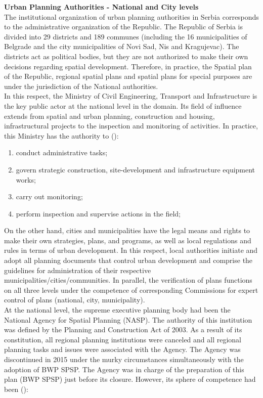 \documentclass[11pt]{report}
\begin{document}
{{{{\textbf{Urban Planning Authorities - National and City levels}
\\
The institutional organization of urban planning authorities in Serbia corresponds to the administrative organization of the Republic. The Republic of Serbia is divided into 29 districts and 189 communes (including the 16 municipalities of Belgrade and the city municipalities of Novi Sad, Nis and Kragujevac). The districts act as political bodies, but they are not authorized to make their own decisions regarding spatial development. Therefore, in practice, the Spatial plan of the Republic, regional spatial plans and spatial plans for special purposes are under the jurisdiction of the National authorities.
\\
In this respect, the Ministry of Civil Engineering, Transport and Infrastructure is the key public actor at the national level in the domain.
Its field of influence extends from spatial and urban planning, construction and housing, infrastructural projects to the inspection and monitoring of activities.
In practice, this Ministry has the authority to (\href{Maksic}{\citealt{maksic_european_2012}}):

\begin{enumerate}
\item conduct administrative tasks;
\item govern strategic construction, site-development and infrastructure equipment works;
\item carry out monitoring;
\item perform inspection and supervise actions in the field;
\end{enumerate} 

On the other hand, cities and municipalities have the legal means and rights to make their own strategies, plans, and programs, as well as local regulations and rules in terms of urban development. In this respect, local authorities initiate and adopt all planning documents that control urban development and comprise the guidelines for administration of their respective municipalities/cities/communities. In parallel, the verification of plans functions on all three levels under the competence of corresponding Commissions for expert control of plans (national, city, municipality).
\\

At the national level, the supreme executive planning body had been the National Agency for Spatial Planning (NASP). The authority of this institution was defined by the Planning and Construction Act of 2003.
As a result of its constitution, all regional planning institutions were canceled and all regional planning tasks and issues were associated with the Agency. 
The Agency was discontinued in 2015 under the murky circumstances simultaneously with the adoption of BWP SPSP. The Agency was in charge of the preparation of this plan (BWP SPSP) just before its closure.
However, its sphere of competence had been (\href{Maksic}{\citealt{maksic_european_2012}}):

}}}}
\end{document}
